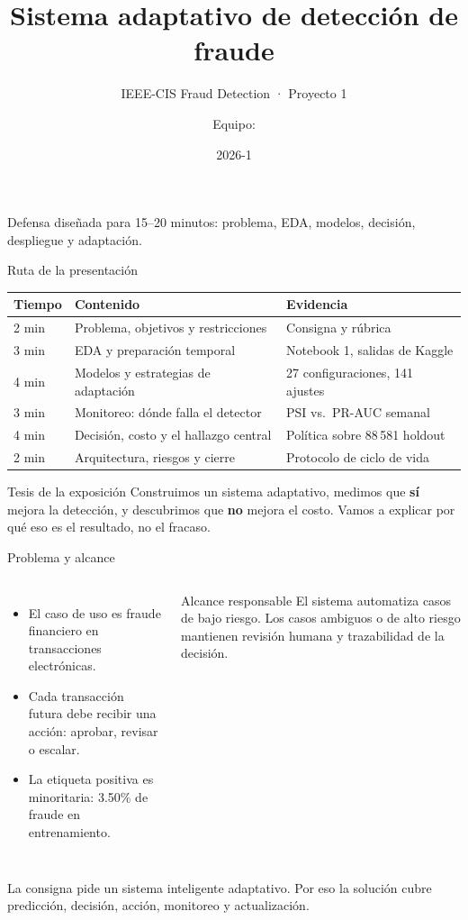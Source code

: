 \documentclass[aspectratio=169,10pt]{beamer}
\title{Sistema adaptativo de detección de fraude}
\subtitle{IEEE-CIS Fraud Detection · Proyecto 1}
\author{Equipo: \underline{\hspace{6cm}}}
\institute{UTEC · Planificación y Toma de Decisiones en IA}
\date{2026-1}
\begin{document}
\begin{frame}
\titlepage
\vspace{-4mm}
\begin{center}\footnotesize Defensa diseñada para 15--20 minutos: problema, EDA, modelos, decisión, despliegue y adaptación.\end{center}
\end{frame}

\begin{frame}{Ruta de la presentación}\small
\begin{tabularx}{\linewidth}{@{}p{.14\linewidth}X p{.26\linewidth}@{}}\toprule
Tiempo & Contenido & Evidencia\\\midrule
2 min & Problema, objetivos y restricciones & Consigna y rúbrica\\
3 min & EDA y preparación temporal & Notebook 1, salidas de Kaggle\\
4 min & Modelos y estrategias de adaptación & 27 configuraciones, 141 ajustes\\
3 min & Monitoreo: dónde falla el detector & PSI vs.\ PR-AUC semanal\\
4 min & Decisión, costo y el hallazgo central & Política sobre 88\,581 holdout\\
2 min & Arquitectura, riesgos y cierre & Protocolo de ciclo de vida\\\bottomrule
\end{tabularx}
\vfill
\begin{block}{Tesis de la exposición}
Construimos un sistema adaptativo, medimos que \textbf{sí} mejora la detección, y descubrimos que \textbf{no} mejora el costo. Vamos a explicar por qué eso es el resultado, no el fracaso.
\end{block}
\end{frame}

\begin{frame}{Problema y alcance}\small
\begin{columns}[T]
\begin{itemize}
\item El caso de uso es fraude financiero en transacciones electrónicas.
\item Cada transacción futura debe recibir una acción: aprobar, revisar o escalar.
\item La etiqueta positiva es minoritaria: 3.50\% de fraude en entrenamiento.
\end{itemize}
\begin{block}{Alcance responsable}
El sistema automatiza casos de bajo riesgo. Los casos ambiguos o de alto riesgo mantienen revisión humana y trazabilidad de la decisión.
\end{block}
\end{columns}
\vfill
\footnotesize La consigna pide un sistema inteligente adaptativo. Por eso la solución cubre predicción, decisión, acción, monitoreo y actualización.
\end{frame}
\end{document}

